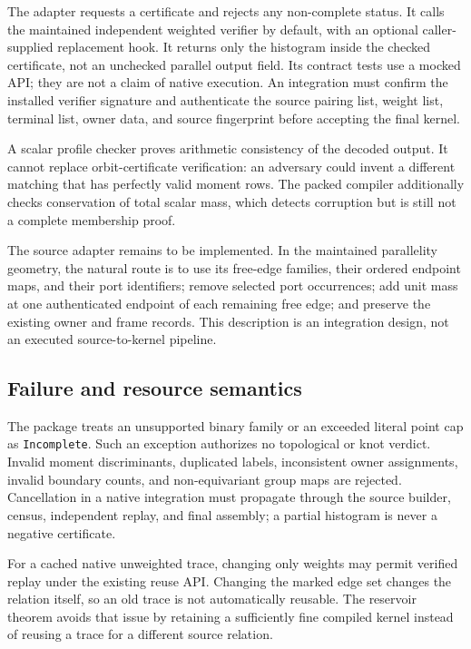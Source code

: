 \documentclass[11pt]{article}
\theoremstyle{definition}\newtheorem{definition}[theorem]{Definition}\newtheorem{example}[theorem]{Example}
\theoremstyle{remark}\newtheorem{remark}[theorem]{Remark}
\newcommand{\code}[1]{\texttt{#1}}
\begin{document}
The adapter requests a certificate and rejects any non-complete status. It calls the maintained independent weighted verifier by default, with an optional caller-supplied replacement hook. It returns only the histogram inside the checked certificate, not an unchecked parallel output field. Its contract tests use a mocked API; they are not a claim of native execution. An integration must confirm the installed verifier signature and authenticate the source pairing list, weight list, terminal list, owner data, and source fingerprint before accepting the final kernel.

A scalar profile checker proves arithmetic consistency of the decoded output. It cannot replace orbit-certificate verification: an adversary could invent a different matching that has perfectly valid moment rows. The packed compiler additionally checks conservation of total scalar mass, which detects corruption but is still not a complete membership proof.

The source adapter remains to be implemented. In the maintained parallelity geometry, the natural route is to use its free-edge families, their ordered endpoint maps, and their port identifiers; remove selected port occurrences; add unit mass at one authenticated endpoint of each remaining free edge; and preserve the existing owner and frame records. This description is an integration design, not an executed source-to-kernel pipeline.

\subsection{Failure and resource semantics}
The package treats an unsupported binary family or an exceeded literal point cap as \code{Incomplete}. Such an exception authorizes no topological or knot verdict. Invalid moment discriminants, duplicated labels, inconsistent owner assignments, invalid boundary counts, and non-equivariant group maps are rejected. Cancellation in a native integration must propagate through the source builder, census, independent replay, and final assembly; a partial histogram is never a negative certificate.

For a cached native unweighted trace, changing only weights may permit verified replay under the existing reuse API. Changing the marked edge set changes the relation itself, so an old trace is not automatically reusable. The reservoir theorem avoids that issue by retaining a sufficiently fine compiled kernel instead of reusing a trace for a different source relation.
\end{document}
